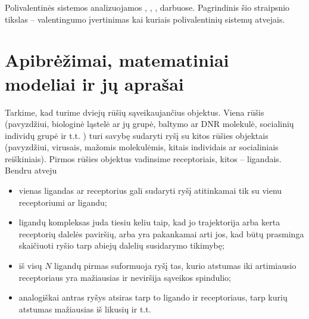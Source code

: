 \documentclass[10pt]{article}
\begin{document}
Polivalentinės  sistemos analizuojamos  \cite{Mammen98}, \cite{Chinlin2000}, \cite{Houseman02},\cite{Klein03} darbuose. Pagrindinis šio straipsnio tikslas -- valentingumo įvertinimas kai kuriais polivalentinių sistemų atvejais.

\section{Apibrėžimai, matematiniai modeliai ir jų aprašai}


Tarkime, kad turime dviejų rūšių sąveikaujančius objektus. Viena rūšis (pavyzdžiui, biologinė ląstelė ar jų grupė, baltymo ar DNR molekulė, socialinių individų grupė ir t.t. ) turi savybę sudaryti ryšį su kitos rūšies objektais (pavyzdžiui, virusais, mažomis molekulėmis, kitais individais ar socialiniais reiškiniais). Pirmos rūšies objektus vadinsime receptoriais, kitos -- ligandais. Bendru atveju 



\begin{itemize}

\item vienas ligandas ar receptorius gali sudaryti ryšį atitinkamai tik su vienu receptoriumi ar ligandu;

\item   ligandų kompleksas juda tiesiu keliu taip, kad jo trajektorija arba kerta receptorių dalelės paviršių, arba yra pakankamai arti jos, kad būtų prasminga skaičiuoti  ryšio tarp abiejų dalelių susidarymo tikimybę;

\item iš visų $N$ ligandų pirmas suformuoja ryšį tas, kurio atstumas iki artimiausio receptoriaus yra  mažiausias ir neviršija sąveikos spindulio;

\item  analogiškai antras ryšys atsiras tarp to ligando ir receptoriaus, tarp kurių atstumas mažiausias iš likusių ir t.t.  
\end{itemize}
               
\end{document}
